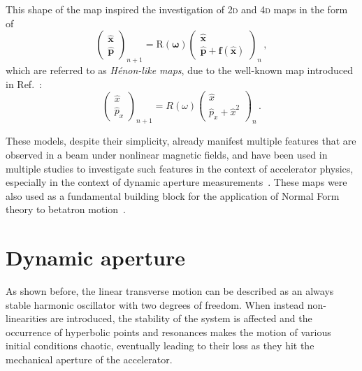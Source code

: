This shape of the map inspired the investigation of 2\textsc{d} and 4\textsc{d} maps in the form of
\begin{equation}
	\begin{pmatrix}
		\hat{\mathbf{x}} \\ \hat{\mathbf{p}}  
	\end{pmatrix}_{n+1}
	=
	\mathrm{R}(\bm\omega)
		\begin{pmatrix}
			\hat{\mathbf{x}} \\ \hat{\mathbf{p}} + \mathbf{f}(\hat{\mathbf{x}})
	\end{pmatrix}_{n} \,,
	\label{eq:henonlike}
\end{equation}
which are referred to as \textit{Hénon-like maps}, due to the well-known map introduced in Ref.~\cite{henon}:
%
\begin{equation}
	\begin{pmatrix}
		\hat x \\ \hat p_x
	\end{pmatrix}_{n+1}
	=
	R(\omega)
		\begin{pmatrix}
			\hat x \\ \hat p_x + \hat x^2
	\end{pmatrix}_{n} \,.
	\label{eq:simplehenon}
\end{equation}

These models, despite their simplicity, already manifest multiple features that are observed in a beam under nonlinear magnetic fields, and have been used in multiple studies to investigate such features in the context of accelerator physics, especially in the context of dynamic aperture measurements~\cite{PhysRevE.53.4067, invlog}. These maps were also used as a fundamental building block for the application of Normal Form theory to betatron motion~\cite{bazzani1994normal}.

\section{Dynamic aperture}
\label{sec:2:dynamic_aperture}

As shown before, the linear transverse motion can be described as an always stable harmonic oscillator with two degrees of freedom. When instead non-linearities are introduced, the stability of the system is affected and the occurrence of hyperbolic points and resonances makes the motion of various initial conditions chaotic, eventually leading to their loss as they hit the mechanical aperture of the accelerator.

